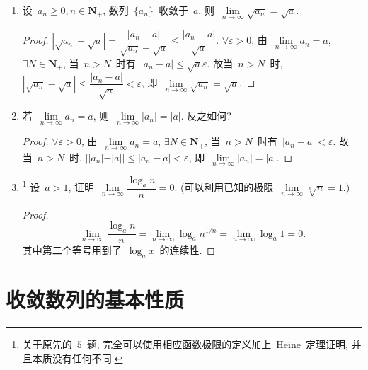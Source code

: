 \documentclass[UTF8,a4paper,11pt,twoside]{book}
\begin{document}
\begin{enumerate}
\begin{proof}
	      \end{proof}
	\item 设~$a_n\geqslant 0, n\in\mathbf{N}_{+}$, 数列~$\{a_n\}$~收敛于~$a$, 则~$\lim\limits_{n\to\infty}\sqrt{a_n}=\sqrt{a}$.
	      \begin{proof}
		      $|\sqrt{a_n}-\sqrt{a}|=\dfrac{|a_n-a|}{\sqrt{a_n}+\sqrt{a}}\leqslant\dfrac{|a_n-a|}{\sqrt{a}}$. $\forall\varepsilon>0$, 由~$\lim\limits_{n\to\infty} a_n=a$, $\exists N\in\mathbf{N}_{+}$, 当~$n>N$~时有~$|a_n-a|\leqslant\sqrt{a}\varepsilon$. 故当~$n>N$~时, ~$|\sqrt{a_n}-\sqrt{a}|\leqslant\dfrac{|a_n-a|}{\sqrt{a}}<\varepsilon$, 即~$\lim\limits_{n\to\infty}\sqrt{a_n}=\sqrt{a}$.\qedhere
	      \end{proof}
	\item 若~$\lim\limits_{n\to\infty} a_n=a$, 则~$\lim\limits_{n\to\infty}|a_n|=|a|$. 反之如何?
	      \begin{proof}
		      $\forall\varepsilon>0$, 由~$\lim\limits_{n\to\infty} a_n=a$, $\exists N\in\mathbf{N}_{+}$, 当~$n>N$~时有~$|a_n-a|<\varepsilon$. 故当~$n>N$~时, $||a_n|-|a||\leqslant|a_n-a|<\varepsilon$, 即~$\lim\limits_{n\to\infty}|a_n|=|a|$.\qedhere
	      \end{proof}
	\item \footnote{关于原先的~$5$~题, 完全可以使用相应函数极限的定义加上~Heine~定理证明, 并且本质没有任何不同.} 设~$a>1$, 证明~$\lim\limits_{n\to\infty}\dfrac{\log_a{n}}{n}=0$. (可以利用已知的极限~$\lim\limits_{n\to\infty}\sqrt[n]{n}=1$.)
	      \begin{proof}
		      \[
			      \lim\limits_{n\to\infty}\dfrac{\log_a{n}}{n}=\lim\limits_{n\to\infty}\log_a{n^{1/n}}=\lim\limits_{n\to\infty}\log_a{1}=0.
		      \]
		      其中第二个等号用到了~$\log_a{x}$~的连续性.\qedhere
	      \end{proof}
\end{enumerate}

\section{收敛数列的基本性质}
\end{document}
